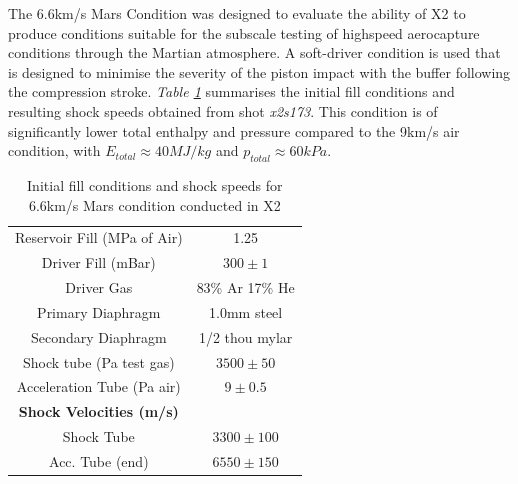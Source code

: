 \documentclass[a4paper,10pt]{article}
\begin{document}
The 6.6km/s Mars Condition was designed to evaluate the ability of X2 to produce conditions suitable for the subscale testing of highspeed aerocapture conditions through the Martian atmosphere.  A soft-driver condition is used that is designed to minimise the severity of the piston impact with the buffer following the compression stroke.  \emph{Table \ref{table:x2_mars_fills}} summarises the initial fill conditions and resulting shock speeds obtained from shot \emph{x2s173}.  This condition is of significantly lower total enthalpy and pressure compared to the 9km/s air condition, with $E_{total} \approx 40 MJ/kg$ and $p_{total} \approx 60kPa$.

\begin{table}[hb]
\begin{center}  %
\begin{tabular*}{0.65\textwidth}%
     {@{\extracolsep{\fill}}cc}
\hline Reservoir Fill (MPa of Air) & 1.25 \\
Driver Fill (mBar) & $300 \pm 1$ \\
Driver Gas & 83\% Ar 17\% He \\
Primary Diaphragm & 1.0mm steel \\
Secondary Diaphragm & 1/2 thou mylar \\
Shock tube (Pa test gas) & $3500 \pm 50$ \\
Acceleration Tube (Pa air) & $9 \pm 0.5$ \\
\textbf{Shock Velocities (m/s)} \\
Shock Tube & $3300 \pm 100$ \\
Acc. Tube (end) & $6550 \pm 150$   \\
\hline
\end{tabular*}
\caption{Initial fill conditions and shock speeds for 6.6km/s Mars condition conducted in X2}
\label{table:x2_mars_fills}
\end{center}
\end{table}
\end{document}
